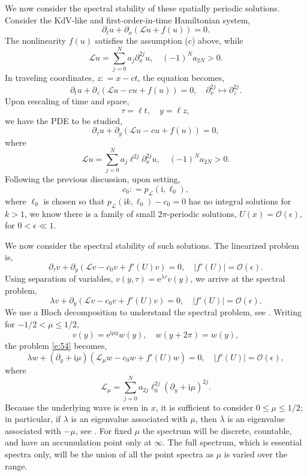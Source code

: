 \documentclass[review,onefignum,onetabnum]{siamart171218}
\def\coloneqq{\mathrel{\mathop:}=}
\newcommand{\rme}{\mathrm{e}}
\newcommand{\rmi}{\mathrm{i}}
\newcommand{\calL}{\mathcal{L}}
\newcommand{\calO}{\mathcal{O}}
\begin{document}

We now consider the spectral stability of these spatially periodic solutions.
Consider the KdV-like and first-order-in-time Hamiltonian system,
\begin{equation}\label{e:52}
\partial_t u+\partial_x\left(\calL u+f(u)\right)=0.
\end{equation}
The nonlinearity $f(u)$ satisfies the assumption (c) above, while
\[
\calL u=\sum_{j=0}^Na_j\partial_x^{2j}u,\quad (-1)^Na_{2N}>0.
\]
In traveling coordinates, $z\coloneqq x-ct$, the equation becomes,
\[
\partial_tu+\partial_z\left(\calL u-cu+f(u)\right)=0,\quad
\partial_x^{2j}\mapsto\partial_z^{2j}.
\]
Upon rescaling of time and space,
\[
\tau=\ell t,\quad y=\ell z,
\]
we have the PDE to be studied,
\begin{equation}\label{e:53}
\partial_\tau u+\partial_y\left(\calL u-cu+f(u)\right)=0,
\end{equation}
where
\[
\calL u=\sum_{j=0}^Na_j\ell^{2j}\partial_x^{2j}u,\quad (-1)^Na_{2N}>0.
\]
Following the previous discussion, upon setting,
\[
c_0\coloneqq p_{\calL}(\rmi,\ell_0),
\]
where $\ell_0$ is chosen so that $p_{\calL}(\rmi k,\ell_0)-c_0=0$ has no integral solutions for $k>1$, we know there is a family of small $2\pi$-periodic solutions,
$U(x)=\calO(\epsilon)$, for $0<\epsilon\ll1$.

We now consider the spectral stability of such solutions. The linearized
problem is,
\[
\partial_\tau v+\partial_y\left(\calL v-c_0v+f'(U)v\right)=0,\quad |f'(U)|=\calO(\epsilon).
\]
Using separation of variables, $v(y,\tau)=\rme^{\lambda\tau}v(y)$, we arrive
at the spectral problem,
\begin{equation}\label{e:54}
\lambda v+\partial_y\left(\calL v-c_0v+f'(U)v\right)=0,\quad |f'(U)|=\calO(\epsilon).
\end{equation}
We use a Bloch decomposition to understand the spectral problem, see
\cite[Chapter~3.3]{kapitula:sad13}. Writing for $-1/2<\mu\le1/2$,
\[
v(y)=\rme^{\rmi\mu y}w(y),\quad w(y+2\pi)=w(y),
\]
the problem \cref{e:54} becomes,
\begin{equation}\label{e:55}
\lambda w+(\partial_y+\rmi \mu)\left(\calL_\mu w-c_0w+f'(U)w\right)=0,\quad |f'(U)|=\calO(\epsilon),
\end{equation}
where
\[
\calL_\mu=\sum_{j=0}^Na_{2j}\ell_0^{2j}(\partial_y+\rmi \mu)^{2j}.
\]
Because
the underlying wave is even in $x$, it is sufficient to consider
$0\le\mu\le1/2$; in particular, if
$\lambda$ is an eigenvalue associated with $\mu$, then $\overline{\lambda}$
is an eigenvalue associated with $-\mu$, see \cite[Section~4]{haragus:ots08}. For fixed $\mu$ the spectrum will be
discrete, countable, and have an accumulation point only at $\infty$. The
full spectrum, which is essential spectra only, will be the union of all the point spectra as $\mu$ is varied over the range.
\end{document}
